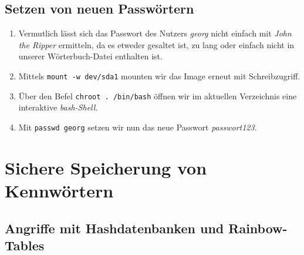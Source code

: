 \documentclass{scrartcl}
\begin{document}
      \subsection{Setzen von neuen Passwörtern}
      \label{sub:Setzen von neuen Passwörtern}

      \begin{enumerate}
        \item Vermutlich lässt sich das Passwort des Nutzers \textit{georg}
              nicht einfach mit \textit{John the Ripper} ermitteln, da es
              etweder gesaltet ist, zu lang oder einfach nicht in unserer
              Wörterbuch-Datei enthalten ist.
        \item Mittels \texttt{mount -w dev/sda1} mounten wir das Image erneut
              mit Schreibzugriff.
        \item Über den Befel \texttt{chroot . /bin/bash} öffnen wir im
              aktuellen Verzeichnis eine interaktive \textit{bash-Shell}.
        \item Mit \texttt{passwd georg} setzen wir nun das neue Passwort
              \textit{passwort123}.
      \end{enumerate}

    \section{Sichere Speicherung von Kennwörtern}
    \label{sec:Sichere Speicherung von Kennwörtern}

      \subsection{Angriffe mit Hashdatenbanken und Rainbow-Tables}
      \label{sub:Angriffe mit Hashdatenbanken und Rainbow-Tables}
\end{document}
